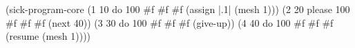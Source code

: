 \begin{CodeBlock}
(sick-program-core
 (1 10 do 100 #f #f #f (assign |.1| (mesh 1)))
 (2 20 please 100 #f #f #f (next 40))
 (3 30 do 100 #f #f #f (give-up))
 (4 40 do 100 #f #f #f (resume (mesh 1))))

\end{CodeBlock}
